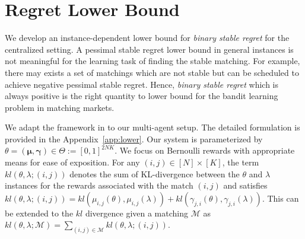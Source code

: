 \documentclass{article}
\begin{document}
\section{Regret Lower Bound}\label{sec:lower}
We develop an instance-dependent lower bound for {\em binary stable regret} for the centralized setting.  A pessimal stable regret lower bound in general instances is not meaningful for the learning task of finding the stable matching. For example, there may exists a set of matchings which are not stable but can be scheduled to achieve negative pessimal stable regret. Hence, {\em binary stable regret} which is always positive is the right quantity to lower bound for the bandit learning problem in matching markets.  

We adapt the framework in \cite{combes2017minimal} to our multi-agent setup. The detailed formulation is provided in the Appendix~\ref{app:lower}. Our system is parameterized by $\theta = (\boldsymbol{\mu}, \boldsymbol{\gamma}) \in  \Theta := [0,1]^{2 N K}$. We focus on Bernoulli  rewards with appropriate means for ease of exposition. For any $(i,j) \in [N]\times [K]$, the term $kl(\theta, \lambda; (i,j))$ denotes the sum of KL-divergence between the $\theta$ and $\lambda$ instances for the rewards associated with the match $(i,j)$ and satisfies
$
kl(\theta, \lambda; (i,j)) = kl(\mu_{i,j}(\theta), \mu_{i,j}(\lambda)) + kl(\gamma_{j,i}(\theta), \gamma_{j,i}(\lambda)).
$ This can be extended to the $kl$ divergence given a matching $\mathcal{M}$ as  
$
kl(\theta, \lambda; \mathcal{M}) = \sum_{(i,j)\in \mathcal{M}} kl(\theta, \lambda; (i,j)).
$
\end{document}

